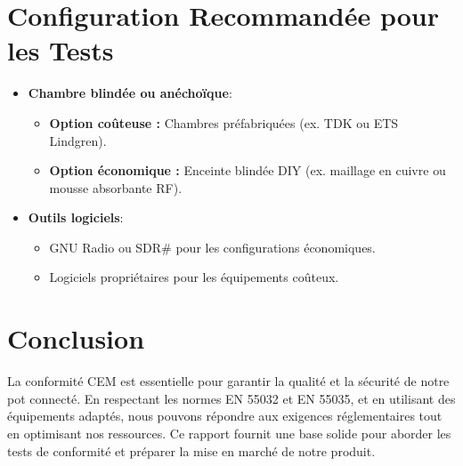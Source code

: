 \documentclass[a4paper,12pt]{article}
\begin{document}
\section{Configuration Recommandée pour les Tests}
\begin{itemize}
    \item \textbf{Chambre blindée ou anéchoïque}:
          \begin{itemize}
              \item \textbf{Option coûteuse :} Chambres préfabriquées (ex. TDK ou ETS Lindgren). %
              \item \textbf{Option économique :} Enceinte blindée DIY (ex. maillage en cuivre ou mousse absorbante RF). %
          \end{itemize}
    \item \textbf{Outils logiciels}:
          \begin{itemize}
              \item GNU Radio ou SDR\# pour les configurations économiques.
              \item Logiciels propriétaires pour les équipements coûteux. %
          \end{itemize}
\end{itemize}

\section*{Conclusion}
La conformité CEM est essentielle pour garantir la qualité et la sécurité de notre pot connecté. En respectant les normes EN 55032 et EN 55035, et en utilisant des équipements adaptés, nous pouvons répondre aux exigences réglementaires tout en optimisant nos ressources. Ce rapport fournit une base solide pour aborder les tests de conformité et préparer la mise en marché de notre produit.
\end{document}
